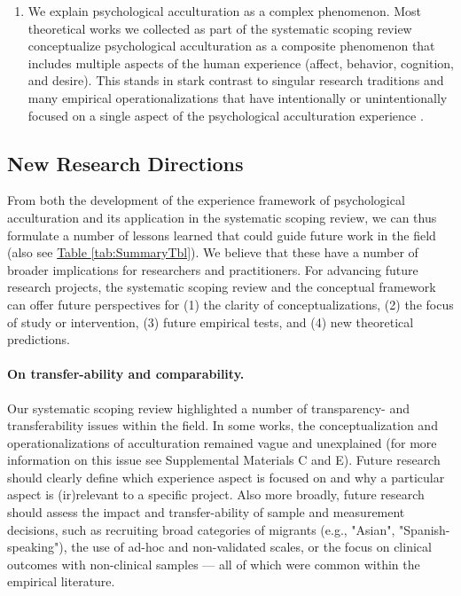 \documentclass[man, 12pt, a4paper, mask]{apa7}
\newcommand{\tblref}[2][]{\hyperref[#2]{Table \ref*{#2}#1}}
\begin{document}
\begin{enumerate}
\item We explain psychological acculturation as a complex phenomenon. Most theoretical works we collected as part of the systematic scoping review conceptualize psychological acculturation as a composite phenomenon that includes multiple aspects of the human experience (affect, behavior, cognition, and desire). This stands in stark contrast to singular research traditions and many empirical operationalizations that have intentionally or unintentionally focused on a single aspect of the psychological acculturation experience \citep[also see][]{Ward2001}.
\end{enumerate}

\subsection{New Research Directions}
From both the development of the experience framework of psychological acculturation and its application in the systematic scoping review, we can thus formulate a number of lessons learned that could guide future work in the field (also see \tblref{tab:SummaryTbl}). We believe that these have a number of broader implications for researchers and practitioners.
For advancing future research projects, the systematic scoping review and the conceptual framework can offer future perspectives for (1) the clarity of conceptualizations, (2) the focus of study or intervention, (3) future empirical tests, and (4) new theoretical predictions. 

\paragraph{On transfer-ability and comparability.} Our systematic scoping review highlighted a number of transparency- and transferability issues within the field. In some works, the conceptualization and operationalizations of acculturation remained vague and unexplained (for more information on this issue see Supplemental Materials C and E). Future research should clearly define which experience aspect is focused on and why a particular aspect is (ir)relevant to a specific project. Also more broadly, future research should assess the impact and transfer-ability of sample and measurement decisions, such as recruiting broad categories of migrants (e.g., "Asian", "Spanish-speaking"), the use of ad-hoc and non-validated scales, or the focus on clinical outcomes with non-clinical samples --- all of which were common within the empirical literature.
\end{document}
